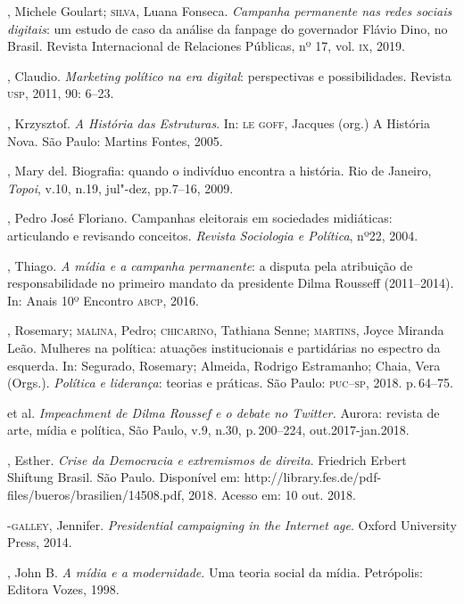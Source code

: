 \begin{bibliohedra}
, Michele Goulart; \textsc{silva}, Luana Fonseca. \emph{Campanha
permanente nas redes sociais digitais}: um estudo de caso da análise da
fanpage do governador Flávio Dino, no Brasil. Revista Internacional de
Relaciones Públicas, nº 17, vol. \textsc{ix}, 2019.

, Claudio. \emph{Marketing político na era digital}:
perspectivas e possibilidades. Revista \textsc{usp}, 2011, 90: 6--23.

, Krzysztof. \emph{A História das Estruturas}. In: \textsc{le} \textsc{goff},
Jacques (org.) A História Nova. São Paulo: Martins Fontes, 2005.

, Mary del. Biografia: quando o indivíduo encontra a história. Rio
de Janeiro, \emph{Topoi}, v.10, n.19, jul"-dez, pp.7--16, 2009.

, Pedro José Floriano. Campanhas eleitorais em sociedades
midiáticas: articulando e revisando conceitos. \emph{Revista
Sociologia e Política}, nº22, 2004.

, Thiago. \emph{A mídia e a campanha permanente}: a disputa
pela atribuição de responsabilidade no primeiro mandato da presidente
Dilma Rousseff (2011--2014). In: Anais 10º Encontro \textsc{abcp}, 2016.

, Rosemary; \textsc{malina}, Pedro; \textsc{chicarino}, Tathiana Senne; \textsc{martins},
Joyce Miranda Leão. Mulheres na política: atuações institucionais e
partidárias no espectro da esquerda. In: Segurado, Rosemary; Almeida,
Rodrigo Estramanho; Chaia, Vera (Orgs.). \emph{Política e liderança}:
teorias e práticas. São Paulo: \textsc{puc--sp}, 2018. p.\,64--75.

\titidem\mbox{} et al. \emph{Impeachment de Dilma Roussef e o
debate no Twitter.} Aurora: revista de arte, mídia e política, São
Paulo, v.9, n.30, p.\,200--224, out.2017-jan.2018.

, Esther. \emph{Crise da Democracia e extremismos de direita}.
Friedrich Erbert Shiftung Brasil. São Paulo. Disponível em:
http://library.fes.de/pdf-files/bueros/brasilien/14508.pdf, 2018. Acesso
em: 10 out. 2018.

-\textsc{galley}, Jennifer. \emph{Presidential campaigning in the
Internet age}. Oxford University Press, 2014.

, John B. \emph{A mídia e a modernidade}. Uma teoria social da
mídia. Petrópolis: Editora Vozes, 1998.
\end{bibliohedra}

